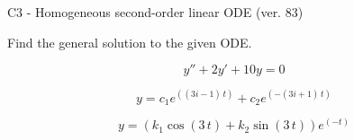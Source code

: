 \begin{exercise}
  \begin{exerciseTitle}C3 - Homogeneous second-order linear ODE (ver. 83)\end{exerciseTitle}
  \begin{exerciseStatement}
    
Find the general solution to the given ODE.

    
\[y''+2y'+10y = 0\]

  \end{exerciseStatement}
  \begin{exerciseAnswer}
    
\[y= c_{1} e^{\left(\left(3 i - 1\right) \, t\right)} + c_{2} e^{\left(-\left(3 i + 1\right) \, t\right)}\]

    
\[y= {\left(k_{1} \cos\left(3 \, t\right) + k_{2} \sin\left(3 \, t\right)\right)} e^{\left(-t\right)}\]

  \end{exerciseAnswer}
\end{exercise}
